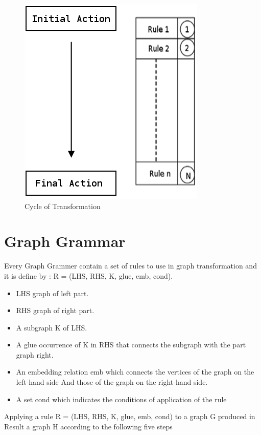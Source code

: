 \vspace{0.5cm}
\begin{figure}[th]
	\centering
		\includegraphics[scale=0.52]{ch3/img/transGrammar}
	\caption{\label{fig:Cycle of Tranformation}Cycle of Transformation\cite{ch3-img}}
\end{figure} 

\pagebreak
\section{Graph Grammar} 
Every Graph Grammer contain a set of rules to use in graph transformation
and it is define by\cite{ch3-doc, ch3-spec} :
R = (LHS, RHS, K, glue, emb, cond). 
\begin{itemize}
\newcommand{\localtextbulletone}{\textcolor{gray}{\raisebox{.45ex}{\rule{.6ex}{.6ex}}}}
\renewcommand{\labelitemi}{\localtextbulletone}
\item LHS graph of left part.
\item RHS graph of right part.
\item A subgraph K of LHS.
\item A glue occurrence of K in RHS that connects the subgraph with the part graph right.
\item An embedding relation emb which connects the vertices of the graph on the left-hand side
And those of the graph on the right-hand side.
\item A set cond which indicates the conditions of application of the rule
\end{itemize}

Applying a rule R = (LHS, RHS, K, glue, emb, cond) to a graph G produced in
Result a graph H according to the following five steps

